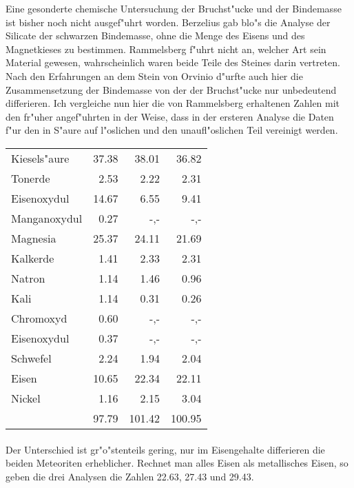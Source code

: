 \documentclass[a4paper, 11pt, oneside]{article}
\begin{document}
Eine gesonderte chemische Untersuchung der Bruchst"ucke und der Bindemasse ist bisher noch nicht ausgef"uhrt worden. Berzelius gab blo"s die Analyse der Silicate der schwarzen Bindemasse, ohne die Menge des Eisens und des Magnetkieses zu bestimmen. Rammelsberg f"uhrt nicht an, welcher Art sein Material gewesen, wahrscheinlich waren beide Teile des Steines darin vertreten. Nach den Erfahrungen an dem Stein von Orvinio d"urfte auch hier die Zusammensetzung der Bindemasse von der der Bruchst"ucke nur unbedeutend differieren. Ich vergleiche nun hier die von Rammelsberg erhaltenen Zahlen mit den fr"uher angef"uhrten in der Weise, dass in der ersteren Analyse die Daten f"ur den in S"aure auf l"oslichen und den unaufl"oslichen Teil vereinigt werden.
\begin{center}
\begin{tabular}{ l r r r }
    Kiesels"aure & 37.38 & 38.01 & 36.82\\
    Tonerde & 2.53 & 2.22 & 2.31\\
    Eisenoxydul & 14.67 & 6.55 & 9.41\\
    Manganoxydul & 0.27 & -,- & -,-\\
    Magnesia & 25.37 & 24.11 & 21.69\\
    Kalkerde & 1.41 & 2.33 & 2.31\\
    Natron & 1.14 & 1.46 & 0.96\\
    Kali & 1.14 & 0.31 & 0.26\\
    Chromoxyd & 0.60 & -,- & -,-\\
    Eisenoxydul & 0.37 & -,- & -,-\\
    Schwefel & 2.24 & 1.94 & 2.04\\
    Eisen & 10.65 & 22.34 & 22.11\\
    Nickel & 1.16 & 2.15 & 3.04\\
     & 97.79 & 101.42 & 100.95\\
\end{tabular}
\end{center}
\paragraph{}
Der Unterschied ist gr"o"stenteils gering, nur im Eisengehalte differieren die beiden Meteoriten erheblicher. Rechnet man alles Eisen als metallisches Eisen, so geben die drei Analysen die Zahlen 22.63, 27.43 und 29.43.
\end{document}
